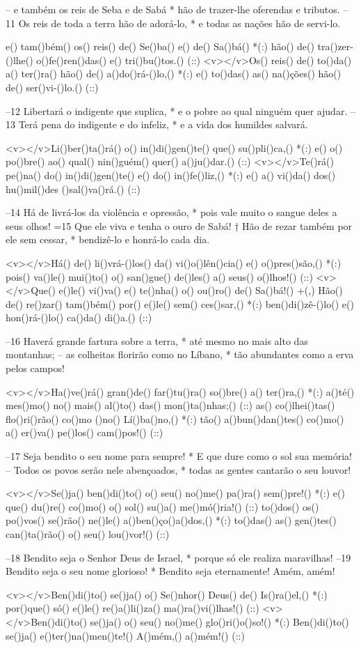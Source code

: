 – e também os reis de Seba e de Sabá *
hão de trazer-lhe oferendas e tributos.
–11 Os reis de toda a terra hão de adorá-lo, *
e todas as nações hão de servi-lo.

e() tam()bém() os() reis() de() Se()ba() e() de() Sa()bá() *(:)
hão() de() tra()zer-()lhe() o()fe()ren()das() e() tri()bu()tos.() (::)
<v></v>Os() reis() de() to()da() a() ter()ra() hão() de() a()do()rá-()lo,() *(:)
e() to()das() as() na()ções() hão() de() ser()vi-()lo.() (::)

–12 Libertará o indigente que suplica, *
e o pobre ao qual ninguém quer ajudar.
–13 Terá pena do indigente e do infeliz, *
e a vida dos humildes salvará.

<v></v>Li()ber()ta()rá() o() in()di()gen()te() que() su()pli()ca,() *(:)
e() o() po()bre() ao() qual() nin()guém() quer() a()ju()dar.() (::)
<v></v>Te()rá() pe()na() do() in()di()gen()te() e() do() in()fe()liz,() *(:)
e() a() vi()da() dos() hu()mil()des ()sal()va()rá.() (::)

–14 Há de livrá-los da violência e opressão, *
pois vale muito o sangue deles a seus olhos!
=15 Que ele viva e tenha o ouro de Sabá! †
Hão de rezar também por ele sem cessar, *
bendizê-lo e honrá-lo cada dia.

<v></v>Há() de() li()vrá-()los() da() vi()o()lên()cia() e() o()pres()são,() *(:)
pois() va()le() mui()to() o() san()gue() de()les() a() seus() o()lhos!() (::)
<v></v>Que() e()le() vi()va() e() te()nha() o() ou()ro() de() Sa()bá!() +(,)
Hão() de() re()zar() tam()bém() por() e()le() sem() ces()sar,() *(:)
ben()di()zê-()lo() e() hon()rá-()lo() ca()da() di()a.() (::)

–16 Haverá grande fartura sobre a terra, *
até mesmo no mais alto das montanhas;
– as colheitas florirão como no Líbano, *
tão abundantes como a erva pelos campos!

<v></v>Ha()ve()rá() gran()de() far()tu()ra() so()bre() a() ter()ra,() *(:)
a()té() mes()mo() no() mais() al()to() das() mon()ta()nhas;() (::)
as() co()lhei()tas() flo()ri()rão() co()mo ()no() Lí()ba()no,() *(:)
tão() a()bun()dan()tes() co()mo() a() er()va() pe()los() cam()pos!() (::)

–17 Seja bendito o seu nome para sempre! *
E que dure como o sol sua memória!
– Todos os povos serão nele abençoados, *
todas as gentes cantarão o seu louvor!

<v></v>Se()ja() ben()di()to() o() seu() no()me() pa()ra() sem()pre!() *(:)
e() que() du()re() co()mo() o() sol() su()a() me()mó()ria!() (::)
to()dos() os() po()vos() se()rão() ne()le() a()ben()ço()a()dos,() *(:)
to()das() as() gen()tes() can()ta()rão() o() seu() lou()vor!() (::)

–18 Bendito seja o Senhor Deus de Israel, *
porque só ele realiza maravilhas!
–19 Bendito seja o seu nome glorioso! *
Bendito seja eternamente! Amém, amém!

<v></v>Ben()di()to() se()ja() o() Se()nhor() Deus() de() Is()ra()el,() *(:)
por()que() só() e()le() re()a()li()za() ma()ra()vi()lhas!() (::)
<v></v>Ben()di()to() se()ja() o() seu() no()me() glo()ri()o()so!() *(:)
Ben()di()to() se()ja() e()ter()na()men()te!() A()mém,() a()mém!() (::)